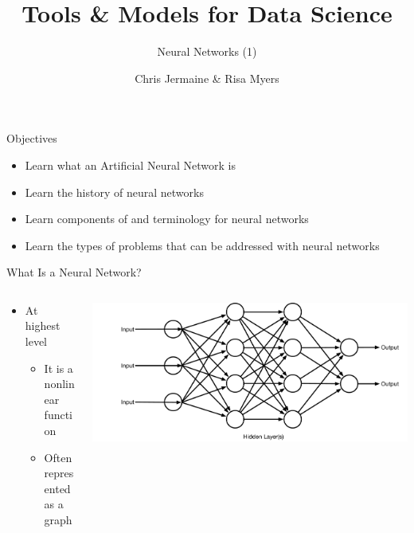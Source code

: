 \documentclass[aspectratio=169]{beamer}
\title[]
{Tools \& Models for Data Science}
\subtitle{Neural Networks (1)}
\author[]{Chris Jermaine \& Risa Myers}
\institute
{
  Rice University 
}
\date[]{}
\begin{document}
\begin{frame}
 \titlepage
\end{frame}
\begin{frame}{Objectives}

\begin{itemize}
\item Learn what an Artificial Neural Network is
\item Learn the history of neural networks
\item Learn components of and terminology for neural networks
\item Learn the types of problems that can be addressed with neural networks
\end{itemize}
\end{frame}
\begin{frame}{What Is a Neural Network?}

\begin{columns}
\begin{column}{0.5\textwidth}
\begin{itemize}
	\item At highest level
	\begin{itemize}
		\item It is a nonlinear function
		\item Often represented as a graph
	\end{itemize}
\end{itemize}
\end{column}
\begin{column}{0.5\textwidth}
\includegraphics[width=1\textwidth]{lectFF/nn.pdf}
\end{column}
\end{columns}
\end{frame}
\end{document}
